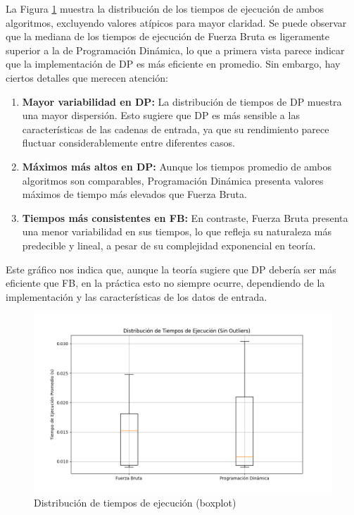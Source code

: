 \noindent La Figura \cref{boxplot} muestra la distribución de los tiempos de ejecución de ambos algoritmos, excluyendo valores atípicos para mayor claridad. Se puede observar que la mediana de los tiempos de ejecución de Fuerza Bruta es ligeramente superior a la de Programación Dinámica, lo que a primera vista parece indicar que la implementación de DP es más eficiente en promedio. Sin embargo, hay ciertos detalles que merecen atención:

\begin{enumerate}
    \item \textbf{Mayor variabilidad en DP:} La distribución de tiempos de DP muestra una mayor dispersión. Esto sugiere que DP es más sensible a las características de las cadenas de entrada, ya que su rendimiento parece fluctuar considerablemente entre diferentes casos.
    
    \item \textbf{Máximos más altos en DP:} Aunque los tiempos promedio de ambos algoritmos son comparables, Programación Dinámica presenta valores máximos de tiempo más elevados que Fuerza Bruta.
    
    \item \textbf{Tiempos más consistentes en FB:} En contraste, Fuerza Bruta presenta una menor variabilidad en sus tiempos, lo que refleja su naturaleza más predecible y lineal, a pesar de su complejidad exponencial en teoría.
\end{enumerate}

Este gráfico nos indica que, aunque la teoría sugiere que DP debería ser más eficiente que FB, en la práctica esto no siempre ocurre, dependiendo de la implementación y las características de los datos de entrada.

\begin{figure}[H]
    \centering
    \includegraphics[width=\textwidth]{images/execution_time_distribution.png}
    \caption{Distribución de tiempos de ejecución (boxplot)}
    \label{boxplot}
\end{figure}
\newpage

